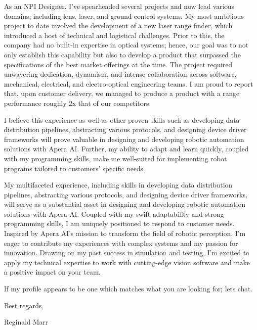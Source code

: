 \documentclass[a4paper,ragged2e,withhyper]{altacv}
\begin{document}
\begin{fullwidth}
\vspace{0.5cm}

\noindent

As an NPI Designer, I've spearheaded several projects and now lead various domains, including lens, laser, and ground control systems. My most ambitious project to date involved the development of a new laser range finder, which introduced a host of technical and logistical challenges. Prior to this, the company had no built-in expertise in optical systems; hence, our goal was to not only establish this capability but also to develop a product that surpassed the specifications of the best market offerings at the time. The project required unwavering dedication, dynamism, and intense collaboration across software, mechanical, electrical, and electro-optical engineering teams. I am proud to report that, upon customer delivery, we managed to produce a product with a range performance roughly 2x that of our competitors.

\vspace{0.5cm}

\noindent

I believe this experience as well as other proven skills such as developing data distribution pipelines, abstracting various protocols, and designing device driver frameworks will prove valuable in designing and developing robotic automation solutions with Apera AI. Further, my ability to adapt and learn quickly, coupled with my programming skills, make me well-suited for implementing robot programs tailored to customers' specific needs.

\vspace{0.5cm}

\noindent

My multifaceted experience, including skills in developing data distribution pipelines, abstracting various protocols, and designing device driver frameworks, will serve as a substantial asset in designing and developing robotic automation solutions with Apera AI. Coupled with my swift adaptability and strong programming skills, I am uniquely positioned to respond to customer needs. Inspired by Apera AI's mission to transform the field of robotic perception, I'm eager to contribute my experiences with complex systems and my passion for innovation. Drawing on my past success in simulation and testing, I'm excited to apply my technical expertise to work with cutting-edge vision software and make a positive impact on your team.

\vspace{0.5cm}

\noindent
If my profile appears to be one which matches what you are looking for; lets chat.

\vspace{0.5cm}

\noindent
Best regards,

\vspace{0.2cm}

\noindent
Reginald Marr

\end{fullwidth}
\end{document}

